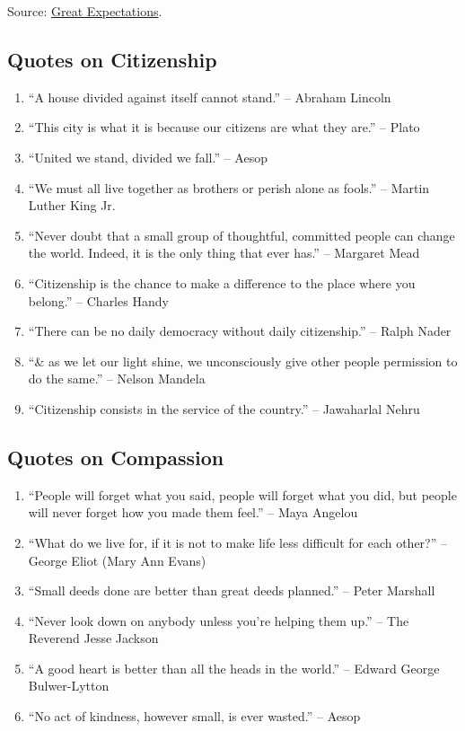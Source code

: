 \documentclass{article}
\begin{document}

Source: \href{http://www.greatexpectations.org/}{Great  Expectations}.

\subsection{Quotes on Citizenship}

\begin{enumerate}
	\item ``A house divided against itself cannot stand.'' -- Abraham Lincoln
	\item ``This city is what it is because our citizens are what they are.'' -- Plato
	\item ``United we stand, divided we fall.'' -- Aesop
	\item ``We must all live together as brothers or perish alone as fools.'' -- Martin Luther King Jr.
	\item ``Never doubt that a small group of thoughtful, committed people can change the world. Indeed, it is the only thing that ever has.'' -- Margaret Mead
	\item ``Citizenship is the chance to make a difference to the place where you belong.'' -- Charles Handy
	\item ``There can be no daily democracy without daily citizenship.'' -- Ralph Nader
	\item ``\& as we let our light shine, we unconsciously give other people permission to do the same.'' -- Nelson Mandela
	\item ``Citizenship consists in the service of the country.'' -- Jawaharlal Nehru
\end{enumerate}

\subsection{Quotes on Compassion}

\begin{enumerate}
	\item ``People will forget what you said, people will forget what you did, but people will never forget how you made them feel.'' -- Maya Angelou
	\item ``What do we live for, if it is not to make life less difficult for each other?'' -- George Eliot (Mary Ann Evans)
	\item ``Small deeds done are better than great deeds planned.'' -- Peter Marshall
	\item ``Never look down on anybody unless you're helping them up.'' -- The Reverend Jesse Jackson
	\item ``A good heart is better than all the heads in the world.'' -- Edward George Bulwer-Lytton
	\item ``No act of kindness, however small, is ever wasted.'' -- Aesop
\end{enumerate}
\end{document}
